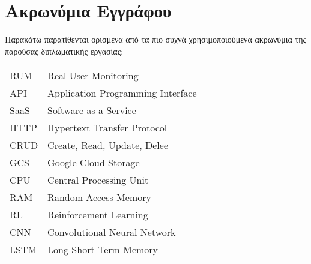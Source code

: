\chapter*{Ακρωνύμια Εγγράφου}
\label{append:acronyms}
{}

Παρακάτω παρατίθενται ορισμένα από τα πιο συχνά χρησιμοποιούμενα ακρωνύμια της
παρούσας διπλωματικής εργασίας:

\begin{table}[htpb]
  \centering
  \begin{tabular}{l@{$\;\;\longrightarrow\;\;$}l}
  RUM & Real User Monitoring \\
  API & Application Programming Interface \\
  SaaS & Software as a Service \\
  HTTP & Hypertext Transfer Protocol \\
  CRUD & Create, Read, Update, Delee \\
  GCS & Google Cloud Storage \\
  CPU & Central Processing Unit \\
  RAM & Random Access Memory \\
  RL & Reinforcement Learning \\
  CNN & Convolutional Neural Network \\
  LSTM & Long Short-Term Memory \\
  \end{tabular}
\end{table}